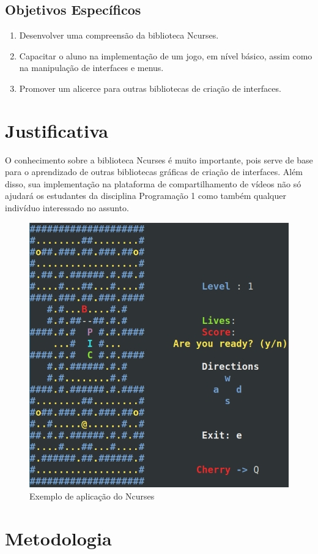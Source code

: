 \documentclass[a4paper,10pt]{article} %
\begin{document}
\subsection{Objetivos Específicos}


\begin{enumerate}
 \item Desenvolver uma compreensão da biblioteca Ncurses.
 \item Capacitar o aluno na implementação de um jogo, em nível básico, assim como na manipulação de interfaces e menus. 
 \item Promover um alicerce para outras bibliotecas de criação de interfaces.   
\end{enumerate}


\section{Justificativa}
O conhecimento sobre a biblioteca Ncurses é muito importante, pois serve de base para o aprendizado de outras bibliotecas gráficas de criação de interfaces. Além disso, sua implementação na plataforma de compartilhamento de vídeos não só ajudará os estudantes da disciplina Programação 1 como também qualquer indivíduo interessado no assunto.

\begin{figure}[ht] %
\centering
\includegraphics[width=.40\linewidth]{imagem.png}
\caption{Exemplo de aplicação do Ncurses}
\label{fig:xsort}
\end{figure}


\section{Metodologia}
\end{document}
